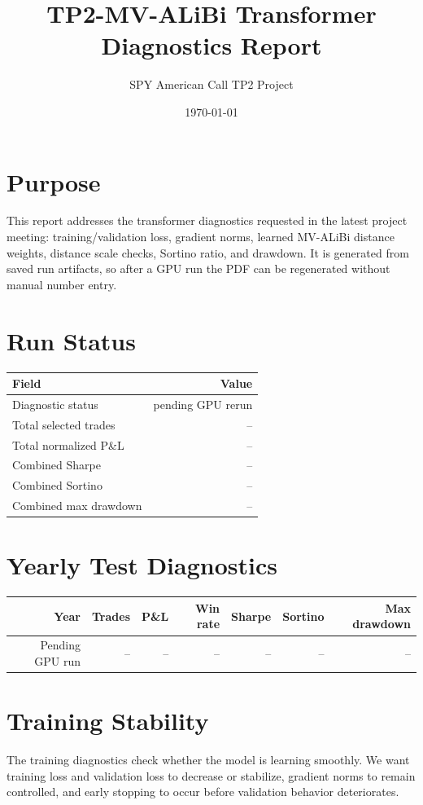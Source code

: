 \documentclass[11pt]{article}
\title{TP2-MV-ALiBi Transformer Diagnostics Report}
\author{SPY American Call TP2 Project}
\date{\today}
\begin{document}
\sloppy
\maketitle

\section{Purpose}
This report addresses the transformer diagnostics requested in the latest project meeting: training/validation loss, gradient norms, learned MV-ALiBi distance weights, distance scale checks, Sortino ratio, and drawdown. It is generated from saved run artifacts, so after a GPU run the PDF can be regenerated without manual number entry.

\section{Run Status}
\begin{table}[H]
\centering
\begin{tabular}{lr}
\toprule
Field & Value \\
\midrule
Diagnostic status & pending GPU rerun \\
Total selected trades & -- \\
Total normalized P\&L & -- \\
Combined Sharpe & -- \\
Combined Sortino & -- \\
Combined max drawdown & -- \\
\bottomrule
\end{tabular}
\end{table}

\section{Yearly Test Diagnostics}
\begin{table}[H]
\centering
\small
\begin{tabular}{rrrrrrr}
\toprule
Year & Trades & P\&L & Win rate & Sharpe & Sortino & Max drawdown \\
\midrule
Pending GPU run & -- & -- & -- & -- & -- & -- \\
\bottomrule
\end{tabular}
\end{table}

\section{Training Stability}
The training diagnostics check whether the model is learning smoothly. We want training loss and validation loss to decrease or stabilize, gradient norms to remain controlled, and early stopping to occur before validation behavior deteriorates.
\end{document}
